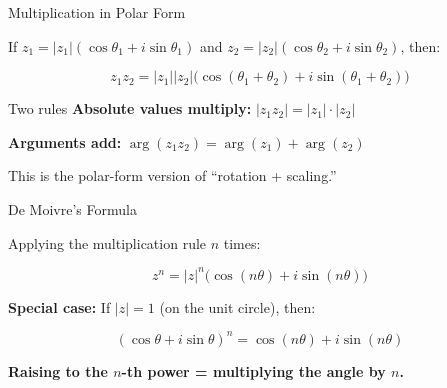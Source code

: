 \documentclass[10pt]{beamer}
\theoremstyle{definition}
\newcommand{\x}[1]{\alert{\textbf{#1}}}
\begin{document}
\begin{frame}{Multiplication in Polar Form}

If $z_1 = |z_1|(\cos\theta_1 + i\sin\theta_1)$ and $z_2 = |z_2|(\cos\theta_2 + i\sin\theta_2)$, then:

\vfill

$$z_1 z_2 = |z_1||z_2|\bigl(\cos(\theta_1 + \theta_2) + i\sin(\theta_1 + \theta_2)\bigr)$$

\vfill\pause

\begin{block}{Two rules}
\x{Absolute values multiply:} $|z_1 z_2| = |z_1| \cdot |z_2|$

\vfill

\x{Arguments add:} $\arg(z_1 z_2) = \arg(z_1) + \arg(z_2)$
\end{block}

\vfill

This is the polar-form version of ``rotation + scaling.''

\end{frame}


\begin{frame}{De Moivre's Formula}

Applying the multiplication rule $n$ times:

$$z^n = |z|^n\bigl(\cos(n\theta) + i\sin(n\theta)\bigr)$$

\vfill\pause

\x{Special case:} If $|z| = 1$ (on the unit circle), then:

$$(\cos\theta + i\sin\theta)^n = \cos(n\theta) + i\sin(n\theta)$$

\vfill

\x{Raising to the $n$-th power = multiplying the angle by $n$.}

\end{frame}
\end{document}
